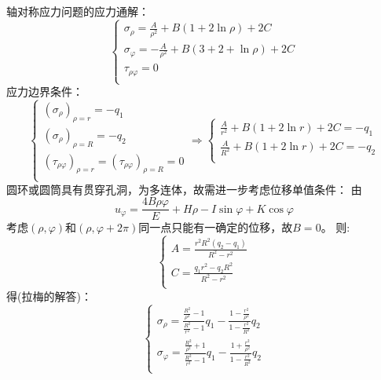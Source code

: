 	\begin{remark}
		轴对称应力问题的应力通解：
		\begin{equation*}
			\begin{cases}
			\sigma _{\rho}=\frac{A}{\rho ^2}+B\left( 1+2\ln \rho \right) +2C\\
			\sigma _{\varphi}=-\frac{A}{\rho ^2}+B\left( 3+2+\ln \rho \right) +2C\\
			\tau _{\rho \varphi}=0\\
			\end{cases}
		\end{equation*}
		应力边界条件：
		\begin{equation*}
			\begin{cases}
			\left( \sigma _{\rho} \right) _{\rho =r}=-q_1\\
			\left( \sigma _{\rho} \right) _{\rho =R}=-q_2\\
			\left( \tau _{\rho \varphi} \right) _{\rho =r}=\left( \tau _{\rho \varphi} \right) _{\rho =R}=0\\
			\end{cases}\Longrightarrow \left\{ \begin{array}{c}
			\frac{A}{r^2}+B\left( 1+2\ln r \right) +2C=-q_1\\
			\frac{A}{R^2}+B\left( 1+2\ln r \right) +2C=-q_2\\
			\end{array} \right. 
		\end{equation*}
		圆环或圆筒具有贯穿孔洞，为多连体，故需进一步考虑位移单值条件：
		由\[u_{\varphi}=\frac{4B\rho \varphi}{E}+H\rho -I\sin \varphi +K\cos \varphi \]
		考虑$\left( \rho ,\varphi \right) \text{和}\left( \rho ,\varphi +2\pi \right) $同一点只能有一确定的位移，故$B=0$。
		则:\[\begin{cases}
		A=\frac{r^2R^2\left( q_2-q_1 \right)}{R^2-r^2}\\
		C=\frac{q_1r^2-q_2R^2}{R^2-r^2}\\
		\end{cases}\]
		得(拉梅的解答)：\[\begin{cases}
		\sigma _{\rho}=\frac{\frac{R^2}{\rho ^2}-1}{\frac{R^2}{r^2}-1}q_1-\frac{1-\frac{r^2}{\rho ^2}}{1-\frac{r^2}{R^2}}q_2\\
		\sigma _{\varphi}=\frac{\frac{R^2}{\rho ^2}+1}{\frac{R^2}{r^2}-1}q_1-\frac{1+\frac{r^2}{\rho ^2}}{1-\frac{r^2}{R^2}}q_2\\
		\end{cases}\]
	\end{remark}

